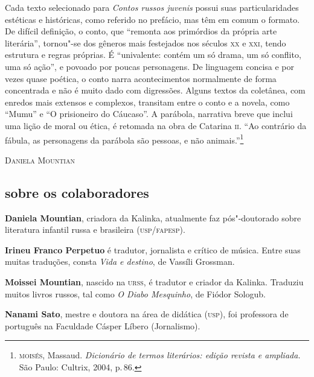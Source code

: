 {\noindent{}Cada texto selecionado para \textit{Contos russos juvenis} possui suas particularidades estéticas e históricas, como referido no prefácio, mas têm em comum o formato.  De difícil definição, o conto, que ``remonta aos primórdios da própria arte literária'', tornou"-se dos gêneros mais festejados nos séculos \textsc{xx} e \textsc{xxi}, tendo estrutura e regras próprias. É ``univalente: contém um só drama, um só conflito, uma só ação'', e povoado por poucas personagens. De linguagem concisa e por vezes quase poética, o conto narra acontecimentos normalmente de forma concentrada e não é muito dado com digressões. Alguns textos da coletânea, com enredos mais extensos e complexos, transitam entre o conto e a novela, como ``Mumu'' e ``O prisioneiro do Cáucaso''. A parábola, narrativa breve que inclui uma lição de moral ou ética, é retomada na obra de Catarina \textsc{ii}. ``Ao contrário da fábula, as personagens da parábola são pessoas, e não animais.''\footnote{\scriptsize\textsc{moisés}, Massaud. \emph{Dicionário de termos literários: edição revista e ampliada.} São Paulo: Cultrix, 2004, p.\,86.}

\bigskip

\noindent\textsc{Daniela Mountian}

\subsection{sobre os colaboradores}

\noindent\textbf{Daniela Mountian}, criadora da Kalinka, atualmente faz pós"-doutorado sobre literatura infantil russa e brasileira (\textsc{usp/fapesp}).

\noindent{}

\noindent\textbf{Irineu Franco Perpetuo} é tradutor, jornalista e crítico de música. Entre suas muitas traduções, consta \textit{Vida e destino}, de Vassíli Grossman.

\noindent\textbf{Moissei Mountian}, nascido na \textsc{urss}, é tradutor e criador da Kalinka. Traduziu muitos livros russos, tal como \textit{O Diabo Mesquinho}, de Fiódor Sologub.

\noindent\textbf{Nanami Sato}, mestre e doutora na área de didática (\textsc{usp}), foi professora de português na Faculdade Cásper Líbero (Jornalismo).

}
